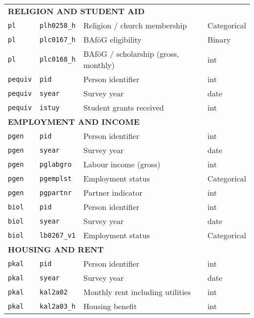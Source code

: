 {\begin{longtable}{llll}
\midrule
\multicolumn{4}{l}{\textbf{RELIGION AND STUDENT AID}} \\
\texttt{pl} & \texttt{plh0258\_h} & Religion / church membership & Categorical \\
\texttt{pl} & \texttt{plc0167\_h} & BAföG eligibility & Binary \\
\texttt{pl} & \texttt{plc0168\_h} & BAföG / scholarship (gross, monthly) & int \\
\texttt{pequiv} & \texttt{pid} & Person identifier & int \\
\texttt{pequiv} & \texttt{syear} & Survey year & date \\
\texttt{pequiv} & \texttt{istuy} & Student grants received & int \\

\midrule
\multicolumn{4}{l}{\textbf{EMPLOYMENT AND INCOME}} \\
\texttt{pgen} & \texttt{pid} & Person identifier & int \\
\texttt{pgen} & \texttt{syear} & Survey year & date \\
\texttt{pgen} & \texttt{pglabgro} & Labour income (gross) & int \\
\texttt{pgen} & \texttt{pgemplst} & Employment status & Categorical \\
\texttt{pgen} & \texttt{pgpartnr} & Partner indicator & int \\
\texttt{biol} & \texttt{pid} & Person identifier & int \\
\texttt{biol} & \texttt{syear} & Survey year & date \\
\texttt{biol} & \texttt{lb0267\_v1} & Employment status & Categorical \\

\midrule
\multicolumn{4}{l}{\textbf{HOUSING AND RENT}} \\
\texttt{pkal} & \texttt{pid} & Person identifier & int \\
\texttt{pkal} & \texttt{syear} & Survey year & date \\
\texttt{pkal} & \texttt{kal2a02} & Monthly rent including utilities & int \\
\texttt{pkal} & \texttt{kal2a03\_h} & Housing benefit & int \\


\end{longtable}}
